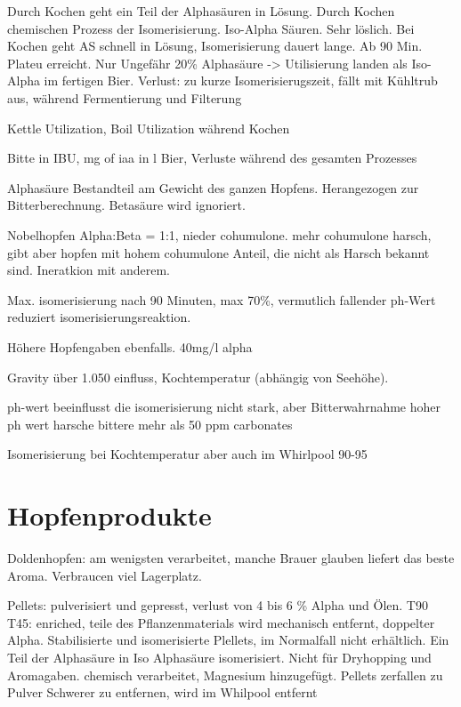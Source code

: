 \documentclass[a4paper,parskip=half]{scrartcl}
\begin{document}
\parencite[12]{Garetz1994}
Durch Kochen geht ein Teil der Alphasäuren in Lösung. Durch Kochen
chemischen Prozess der Isomerisierung. Iso-Alpha Säuren. Sehr löslich.
Bei Kochen geht AS schnell in Lösung, Isomerisierung dauert lange.
Ab 90 Min. Plateu erreicht.
Nur Ungefähr 20\% Alphasäure -> Utilisierung landen als Iso-Alpha im
fertigen Bier.
Verlust: zu kurze Isomerisierugszeit, fällt mit Kühltrub aus,
während Fermentierung und Filterung

\parencite[13]{Garetz1994}
Kettle Utilization, Boil Utilization während Kochen

\parencite[14]{Garetz1994} 
Bitte in IBU, mg of iaa in l Bier, Verluste während des gesamten
Prozesses

\parencite[34]{Garetz1994}
Alphasäure Bestandteil am Gewicht des ganzen Hopfens. Herangezogen
zur Bitterberechnung. Betasäure wird ignoriert.

\parencite[35]{Garetz1994}
Nobelhopfen Alpha:Beta = 1:1, nieder cohumulone.
mehr cohumulone harsch, gibt aber hopfen mit hohem cohumulone
Anteil, die nicht als Harsch bekannt sind. Ineratkion
mit anderem.

\parencite[128]{Garetz1994} 
Max. isomerisierung nach 90 Minuten, max 70\%, vermutlich fallender
ph-Wert reduziert isomerisierungsreaktion.

Höhere Hopfengaben ebenfalls. 40mg/l alpha 

\parencite[129]{Garetz1994} 
Gravity über 1.050 einfluss, Kochtemperatur (abhängig von Seehöhe).


\parencite[78]{Daniels1996}
ph-wert beeinflusst die isomerisierung nicht stark, aber Bitterwahrnahme
hoher ph wert harsche bittere mehr als 50 ppm carbonates

\parencite[49]{Holle2010} Isomerisierung bei Kochtemperatur
aber auch im Whirlpool 90-95


\section*{Hopfenprodukte}

\parencite[80\psq]{Garetz1994}
Doldenhopfen: am wenigsten verarbeitet, manche Brauer glauben
liefert das beste Aroma. Verbraucen viel Lagerplatz.

\parencite[82\psqq]{Garetz1994}
Pellets: pulverisiert und gepresst, verlust von 4 bis 6 \% Alpha
und Ölen.
T90
T45: enriched, teile des Pflanzenmaterials wird mechanisch
entfernt, doppelter Alpha.
Stabilisierte und isomerisierte Plellets, im Normalfall nicht
erhältlich. Ein Teil der Alphasäure in Iso Alphasäure
isomerisiert. Nicht für Dryhopping und Aromagaben.
chemisch verarbeitet, Magnesium hinzugefügt.
Pellets zerfallen zu Pulver
Schwerer zu entfernen, wird im Whilpool entfernt \parencite[87]{Garetz1994}
\end{document}
